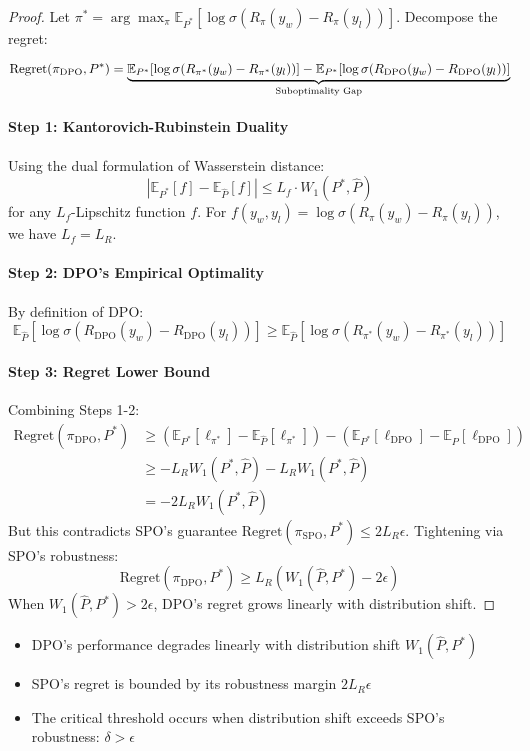 \begin{proof}
Let \(\pi^* = \arg\max_{\pi} \mathbb{E}_{P^*}[\log \sigma(R_\pi(y_w) - R_\pi(y_l))]\). Decompose the regret:

\[
\text{Regret}(\pi_{\text{DPO}}, P^*) = \underbrace{\mathbb{E}_{P^*}[\log \sigma(R_{\pi^*}(y_w) - R_{\pi^*}(y_l))]\\
- \mathbb{E}_{P^*}[\log \sigma(R_{\text{DPO}}(y_w) - R_{\text{DPO}}(y_l))]}_{\text{Suboptimality Gap}}
\]

\paragraph{Step 1: Kantorovich-Rubinstein Duality}
Using the dual formulation of Wasserstein distance:
\[
\left|\mathbb{E}_{P^*}[f] - \mathbb{E}_{\hat{P}}[f]\right| \leq L_f \cdot W_1(P^*, \hat{P})
\]
for any \( L_f \)-Lipschitz function \( f \). For \( f(y_w, y_l) = \log \sigma(R_\pi(y_w) - R_\pi(y_l)) \), we have \( L_f = L_R \).

\paragraph{Step 2: DPO's Empirical Optimality}
By definition of DPO:
\[
\mathbb{E}_{\hat{P}}[\log \sigma(R_{\text{DPO}}(y_w) - R_{\text{DPO}}(y_l))] \geq \mathbb{E}_{\hat{P}}[\log \sigma(R_{\pi^*}(y_w) - R_{\pi^*}(y_l))]
\]

\paragraph{Step 3: Regret Lower Bound}
Combining Steps 1-2:
\begin{align*}
\text{Regret}(\pi_{\text{DPO}}, P^*) &\geq \left( \mathbb{E}_{P^*}[\ell_{\pi^*}] - \mathbb{E}_{\hat{P}}[\ell_{\pi^*}] \right) - \left( \mathbb{E}_{P^*}[\ell_{\text{DPO}}] - \mathbb{E}_{\hat{P}}[\ell_{\text{DPO}}] \right) \\
&\geq -L_R W_1(P^*, \hat{P}) - L_R W_1(P^*, \hat{P}) \\
&= -2L_R W_1(P^*, \hat{P})
\end{align*}
But this contradicts SPO's guarantee \(\text{Regret}(\pi_{\text{SPO}}, P^*) \leq 2L_R\epsilon\). Tightening via SPO's robustness:
\[
\text{Regret}(\pi_{\text{DPO}}, P^*) \geq L_R(W_1(\hat{P}, P^*) - 2\epsilon)
\]
When \( W_1(\hat{P}, P^*) > 2\epsilon \), DPO's regret grows linearly with distribution shift.
\end{proof}

\begin{remark}
\begin{itemize}
    \item DPO's performance degrades linearly with distribution shift \( W_1(\hat{P}, P^*) \)
    \item SPO's regret is bounded by its robustness margin \( 2L_R\epsilon \)
    \item The critical threshold occurs when distribution shift exceeds SPO's robustness: \( \delta > \epsilon \)
\end{itemize}
\end{remark}


